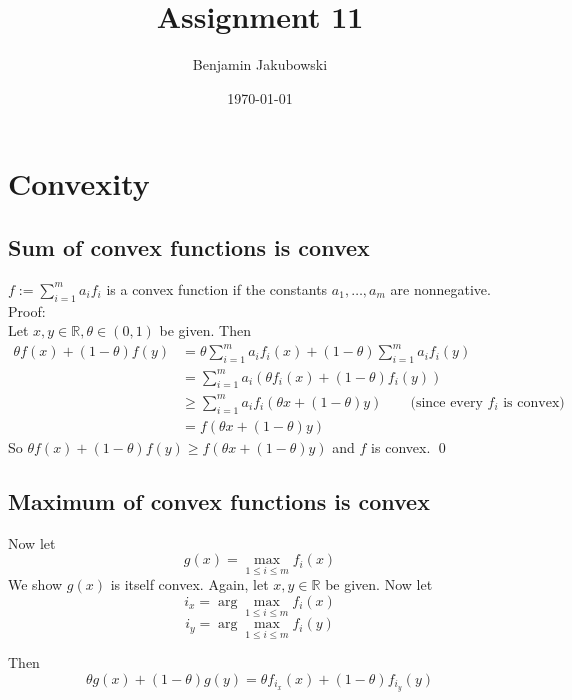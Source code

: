 \documentclass[paper=a4, fontsize=11pt]{scrartcl} %
\title{	Assignment 11}
\author{Benjamin Jakubowski} %
\date{\normalsize\today} %
\numberwithin{equation}{section} %
\numberwithin{figure}{section} %
\numberwithin{table}{section} %
\begin{document}
\maketitle %


\section{Convexity}

\subsection{Sum of convex functions is convex}

$f := \sum_{i=1}^m a_if_i$ is a convex function if the constants $a_1, \dots, a_m$ are nonnegative. \\

Proof:\\

Let $x, y \in \mathbb{R}, \theta \in (0,1)$ be given. Then
\begin{align*}
\theta f(x) + (1-\theta)f(y) &= \theta \sum_{i=1}^m a_i f_i(x) + (1-\theta)\sum_{i=1}^ma_if_i(y) \\ 
   &= \sum_{i=1}^m a_i \left( \theta f_i(x) + (1-\theta)f_i(y)\right) \\
   &\geq \sum_{i=1}^m a_i f_i\left(\theta x + (1-\theta)y\right) \qquad{} \text{(since every $f_i$ is convex)}  \\
   &= f\left(\theta x + (1-\theta)y\right)
\end{align*}
So $\theta f(x) + (1-\theta)f(y) \geq f\left(\theta x + (1-\theta)y\right)$ and $f$ is convex. \qed

\subsection{Maximum of convex functions is convex}

Now let
\[g(x) = \max_{1 \leq i \leq m} f_i(x)\]
We show $g(x)$ is itself convex. Again, let $x, y \in \mathbb{R}$ be given. Now let
\[i_x = \arg \max_{1 \leq i \leq m} f_i(x)\]
\[i_y = \arg \max_{1 \leq i \leq m} f_i(y)\]

Then
\[
\theta g(x) + (1-\theta)g(y) = \theta f_{i_x}(x) + (1-\theta)f_{i_y}(y)
\]
\end{document}

